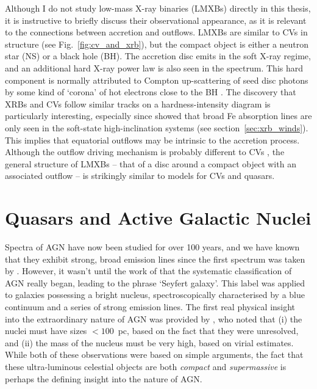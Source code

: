 Although I do not study low-mass X-ray binaries (LMXBs) 
directly in this thesis, it is instructive
to briefly discuss their observational appearance, 
as it is relevant to the connections between accretion and outflows.
LMXBs are similar to CVs in structure (see Fig.~\ref{fig:cv_and_xrb}), 
but the compact object is either a neutron star (NS) or a black hole (BH). 
The accretion disc 
emits in the soft X-ray regime, and an additional hard X-ray power law is also 
seen in the spectrum. This hard component is normally attributed
to Compton up-scattering of seed disc photons by some kind of `corona'
of hot electrons close to the BH \citep[e.g.][]{white1988,mitsuda1989,uttley2014}.
The discovery that XRBs and CVs follow similar 
tracks on a hardness-intensity diagram \citep[HID;][]{kordingDNjet2008}
is particularly interesting, especially since \cite{ponti2012}
showed that broad Fe absorption lines are only seen in the soft-state 
high-inclination systems (see section~\ref{sec:xrb_winds}). 
This implies that equatorial outflows may be intrinsic to 
the accretion process. Although the outflow driving mechanism
is probably different to CVs \citep[e.g.][]{diaztrigo2015}, 
the general structure of LMXBs -- that of a disc around a compact object with
an associated outflow -- is strikingly similar to models for CVs and quasars.



\section{Quasars and Active Galactic Nuclei}

Spectra of AGN have now been studied for over 100 years, and we have known 
that they exhibit strong, broad emission lines since the first spectrum was taken by
\cite{fath1909}. However, it wasn't until the work of \cite{seyfert1943} that the systematic 
classification of AGN really began, leading to the phrase `Seyfert galaxy'.
This label was applied to galaxies possessing a bright nucleus, spectroscopically
characterised by a blue continuum and a series of strong emission lines.
The first real physical insight into the extraordinary nature of AGN
was provided by \cite{woltjer1959}, who noted that 
(i) the nuclei must have sizes $<100$~pc,
based on the fact that they were unresolved, and (ii) the mass of the nucleus
must be very high, based on virial estimates. 
While both of these observations were based on simple arguments, the fact that these
ultra-luminous celestial objects are both {\em compact} and {\em supermassive}
is perhaps the defining insight into the nature of AGN.

